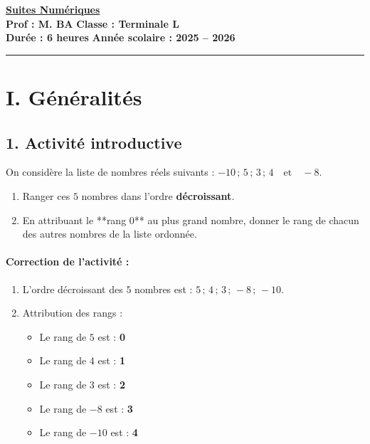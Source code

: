 \documentclass[12pt,a4paper]{article}
\begin{document}
\begin{center}
    \Large\textbf{\underline{\textcolor{myred}{Suites Numériques}}}\\[0.2cm]
    \normalsize\textbf{Prof : M. BA} \hfill \textbf{Classe : Terminale L}\\[0.1cm]
    \textbf{Durée : 6 heures} \hfill \textbf{Année scolaire : 2025 -- 2026}
\end{center}
\hrule
\vspace{0.3cm}

\section*{\color{myred}I. Généralités}

\subsection*{\color{myred}1. Activité introductive}

\begin{tcolorbox}[colback=blue!5!white,colframe=myblue,title=\textbf{Activité : Découverte de la notion de suite}]
On considère la liste de nombres réels suivants : $-10 \,;\, 5 \,;\, 3 \,;\, 4 \quad \text{et} \quad -8$.

\begin{enumerate}
    \item Ranger ces $5$ nombres dans l'ordre \textbf{décroissant}.
    \item En attribuant le **rang $0$** au plus grand nombre, donner le rang de chacun des autres nombres de la liste ordonnée.
\end{enumerate}
\end{tcolorbox}

\vspace{0.2cm}

\paragraph{\color{mygreen}Correction de l'activité :}
\begin{enumerate}
    \item L'ordre décroissant des $5$ nombres est : $5 \,;\, 4 \,;\, 3 \,;\, -8 \,;\, -10$.
    \item Attribution des rangs :
    \begin{itemize}[label=$\bullet$]
        \item Le rang de $5$ est : \textbf{0}
        \item Le rang de $4$ est : \textbf{1}
        \item Le rang de $3$ est : \textbf{2}
        \item Le rang de $-8$ est : \textbf{3}
        \item Le rang de $-10$ est : \textbf{4}
    \end{itemize}
\end{enumerate}
\end{document}
